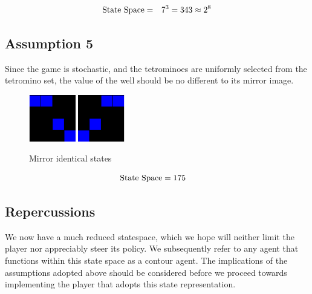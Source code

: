 \documentclass{rucsthesis}
\begin{document}
\begin{eqnarray}
\centering
\textrm{State Space} & = & 7^{3} = 343 \approx 2^{8}
\end{eqnarray}

\subsection*{Assumption 5}

Since the game is stochastic, and the tetrominoes are uniformly selected from the tetromino set, the value of the well should be no different to its mirror image.

\begin{figure}[h]
\centering
\includegraphics[width=0.8in]{reducedwell.png}
\includegraphics[width=0.8in]{mirrorwell.png}
\caption{Mirror identical states}
\label{fig:mirrorwell}
\end{figure}

\begin{eqnarray}
\centering
\textrm{State Space} & = 175
\end{eqnarray}

\subsection*{Repercussions}

We now have a much reduced statespace, which we hope will neither limit the player nor appreciably steer its policy. We subsequently refer to any agent that functions within this state space as a contour agent. The implications of the assumptions adopted above should be considered before we proceed towards implementing the player that adopts this state representation.
\end{document}
